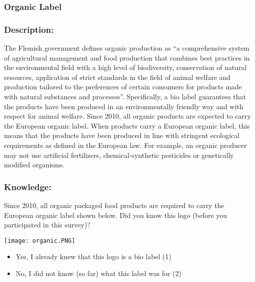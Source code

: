 \documentclass[sustainability,article,accept,moreauthors,pdftex,10pt,a4paper]{Definitions/mdpi}
\theoremstyle{mdpi}
\newcounter{ex}
\newcounter{re}
\theoremstyle{mdpidefinition}
\begin{document}
{\subsubsection{Organic Label}
\unskip
\subsubsection*{Description:}
\par{The Flemish government defines organic production as ``a comprehensive system of agricultural management and food production that combines best practices in the environmental field with a high level of biodiversity, conservation of natural resources, application of strict standards in the field of animal welfare and production tailored to the preferences of certain consumers for products made with natural substances and processes''. Specifically, a bio label guarantees that the products have been produced in an environmentally friendly way and with respect for animal welfare. Since 2010, all organic products are expected to carry the European organic label. When products carry a European organic label, this means that the products have been produced in line with stringent ecological requirements as defined in the European law.  For example, an organic producer may not use artificial fertilizers, chemical-synthetic pesticides or genetically modified organisms.}

\newpage
\subsubsection*{Knowledge:}
\par{Since 2010, all organic packaged food products are required to carry the European organic label shown below.  Did you know this logo (before you participated in this survey)?

\begin{minipage}{0.5\textwidth}
\begin{centering}
\texttt{[image: organic.PNG]}
\end{centering}
\end{minipage}
\begin{itemize}
\item Yes, I already knew that this logo is a bio label (1)
\item No, I did not know (so far) what this label was for (2)
\end{itemize}
}
}
\end{document}
